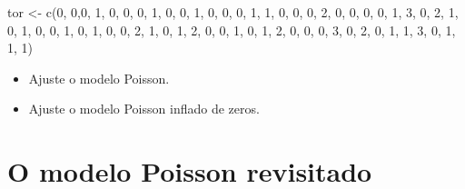 \documentclass[
  letterpaper,
  DIV=11,
  numbers=noendperiod]{scrreprt}
\newenvironment{Shaded}{\begin{snugshade}}{\end{snugshade}}
\newcommand{\DecValTok}[1]{\textcolor[rgb]{0.68,0.00,0.00}{#1}}
\newcommand{\FunctionTok}[1]{\textcolor[rgb]{0.28,0.35,0.67}{#1}}
\newcommand{\NormalTok}[1]{\textcolor[rgb]{0.00,0.23,0.31}{#1}}
\newcommand{\OtherTok}[1]{\textcolor[rgb]{0.00,0.23,0.31}{#1}}
\theoremstyle{definition}
\theoremstyle{definition}
\theoremstyle{remark}
\begin{document}
\begin{Shaded}
\begin{Highlighting}[]
\NormalTok{tor }\OtherTok{\textless{}{-}} \FunctionTok{c}\NormalTok{(}\DecValTok{0}\NormalTok{, }\DecValTok{0}\NormalTok{,}\DecValTok{0}\NormalTok{, }\DecValTok{1}\NormalTok{, }\DecValTok{0}\NormalTok{, }\DecValTok{0}\NormalTok{, }\DecValTok{0}\NormalTok{, }\DecValTok{1}\NormalTok{, }\DecValTok{0}\NormalTok{, }\DecValTok{0}\NormalTok{,}
\DecValTok{1}\NormalTok{, }\DecValTok{0}\NormalTok{, }\DecValTok{0}\NormalTok{, }\DecValTok{0}\NormalTok{, }\DecValTok{1}\NormalTok{, }\DecValTok{1}\NormalTok{, }\DecValTok{0}\NormalTok{, }\DecValTok{0}\NormalTok{, }\DecValTok{0}\NormalTok{, }\DecValTok{2}\NormalTok{,}
\DecValTok{0}\NormalTok{, }\DecValTok{0}\NormalTok{, }\DecValTok{0}\NormalTok{, }\DecValTok{0}\NormalTok{, }\DecValTok{1}\NormalTok{, }\DecValTok{3}\NormalTok{, }\DecValTok{0}\NormalTok{, }\DecValTok{2}\NormalTok{, }\DecValTok{1}\NormalTok{, }\DecValTok{0}\NormalTok{,}
\DecValTok{1}\NormalTok{, }\DecValTok{0}\NormalTok{, }\DecValTok{0}\NormalTok{, }\DecValTok{1}\NormalTok{, }\DecValTok{0}\NormalTok{, }\DecValTok{1}\NormalTok{, }\DecValTok{0}\NormalTok{, }\DecValTok{0}\NormalTok{, }\DecValTok{2}\NormalTok{, }\DecValTok{1}\NormalTok{,}
\DecValTok{0}\NormalTok{, }\DecValTok{1}\NormalTok{, }\DecValTok{2}\NormalTok{, }\DecValTok{0}\NormalTok{, }\DecValTok{0}\NormalTok{, }\DecValTok{1}\NormalTok{, }\DecValTok{0}\NormalTok{, }\DecValTok{1}\NormalTok{, }\DecValTok{2}\NormalTok{, }\DecValTok{0}\NormalTok{,}
\DecValTok{0}\NormalTok{, }\DecValTok{0}\NormalTok{, }\DecValTok{3}\NormalTok{, }\DecValTok{0}\NormalTok{, }\DecValTok{2}\NormalTok{, }\DecValTok{0}\NormalTok{, }\DecValTok{1}\NormalTok{, }\DecValTok{1}\NormalTok{, }\DecValTok{3}\NormalTok{, }\DecValTok{0}\NormalTok{,}
\DecValTok{1}\NormalTok{, }\DecValTok{1}\NormalTok{, }\DecValTok{1}\NormalTok{)}
\end{Highlighting}
\end{Shaded}

\begin{itemize}
\item
  Ajuste o modelo Poisson.
\item
  Ajuste o modelo Poisson inflado de zeros.
\end{itemize}


\hypertarget{o-modelo-poisson-revisitado}{%
\chapter{O modelo Poisson
revisitado}\label{o-modelo-poisson-revisitado}}
\end{document}
